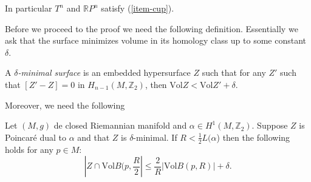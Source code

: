 \noindent
In particular $T^n$ and $\mathbb{R}P^n$
satisfy (\ref{item-cup}).

Before we proceed to the proof we need the
following definition.
Essentially we ask that the surface minimizes
volume in its homology
class up to some constant $\delta$.

\begin{definition}
\label{definition-delta-minimal-surface}
A  {\it $\delta$-minimal surface} is an
embedded hypersurface $Z$
such that for any $Z'$ such that $[Z'-Z] = 0$
in  $H_{n-1}(M,\mathbb{Z}_2)$,
then  $\text{Vol}Z < \text{Vol}Z'+\delta$.
\end{definition}

\noindent
Moreover, we need the following

\begin{lemma}[Stability]
\label{lemma-stability}
Let $(M,g)$ de closed Riemannian manifold and
$\alpha \in H^1(M,\mathbb{Z}_2)$.
Suppose $Z$ is Poincaré dual to $\alpha$ and
that $Z$ is $\delta$-minimal.
If $R<\frac{1}{2}L(\alpha$) then the
following
holds for any $p \in M$:
$$
|Z \cap \text{Vol}B(p,\frac{R}{2}|\leq
\frac{2}{R}|\text{Vol}B(p,R)|+\delta.
$$
\end{lemma}

